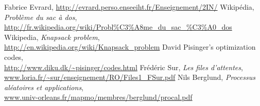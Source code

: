   Fabrice Evrard, \url{http://evrard.perso.enseeiht.fr/Enseignement/2IN/}
  Wikipédia, \emph{Problème du sac à dos},\\
  \url{http://fr.wikipedia.org/wiki/Probl\%C3\%A8me_du_sac_\%C3\%A0_dos}
  Wikipedia, \emph{Knapsack problem},\\
  \url{http://en.wikipedia.org/wiki/Knapsack_problem}
  David Pisinger's optimization codes,\\
  \url{http://www.diku.dk/~pisinger/codes.html}
  Frédéric Sur, \emph{Les files d'attentes}, \\
  \url{www.loria.fr/~sur/enseignement/RO/Files1_FSur.pdf}
  Nils Berglund, \emph{Processus aléatoires et applications}, \\
  \url{www.univ-orleans.fr/mapmo/membres/berglund/procal.pdf}
